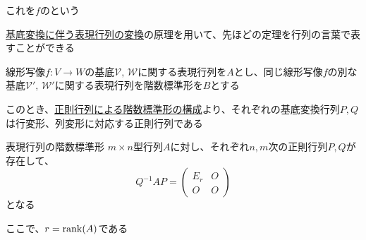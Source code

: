 \documentclass[../../../topic_linear-algebra]{subfiles}
\begin{document}
これを$f$のという

\sectionline

\hyperref[thm:change-of-representation-matrix]{基底変換に伴う表現行列の変換}の原理を用いて、先ほどの定理を行列の言葉で表すことができる

\br

線形写像$f\colon V \to W$の基底$\mathcal{V},\, \mathcal{W}$に関する表現行列を$A$とし、同じ線形写像$f$の別な基底$\mathcal{V}',\, \mathcal{W}'$に関する表現行列を階数標準形を$B$とする

このとき、\hyperref[thm:rank-normal-form-by-regular-matrices]{正則行列による階数標準形の構成}より、それぞれの基底変換行列$P,Q$は行変形、列変形に対応する正則行列である

\begin{theorem}{表現行列の階数標準形}
  $m\times n$型行列$A$に対し、それぞれ$n,m$次の正則行列$P,Q$が存在して、
  \begin{equation*}
    Q^{-1} A P = \begin{pmatrix}
      E_r & O \\
      O   & O
    \end{pmatrix}
  \end{equation*}
  となる

  ここで、$r = \rank(A)$である
\end{theorem}
\end{document}
